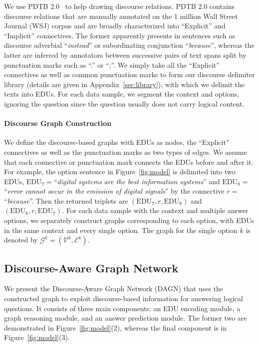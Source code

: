 \documentclass[11pt]{article}
\newcommand{\moe}[1]{{\color{black} #1}}
\begin{document}
\moe{We use PDTB 2.0~\cite{prasad2008penn} to help drawing discourse relations.}
PDTB 2.0 contains discourse relations that are manually annotated on the 1 million Wall Street Journal (WSJ) corpus and are broadly characterized into ``Explicit'' and ``Implicit'' connectives.
The former apparently presents in sentences such as discourse adverbial ``\textit{instead}'' or subordinating conjunction ``\textit{because}'',
whereas the latter are inferred by annotators between successive pairs of text spans split by punctuation marks such as ``.'' or ``;''.
We simply take all the ``Explicit'' connectives as well as common punctuation marks to form our discourse delimiter library (details are given in Appendix~\ref{sec:library}), with which we delimit the texts into EDUs.
For each data sample, we segment the context and options, ignoring the question since the question usually does not carry logical content.

\paragraph{Discourse Graph Construction} 
We define the discourse-based graphs with EDUs as nodes, the ``Explicit'' connectives as well as the punctuation marks as two types of edges.
We assume that each connective or punctuation mark connects the EDUs before and after it.
For example, the option sentence in Figure~\ref{fig:model}
is delimited into two EDUs, $\text{EDU}_7=$``\textit{digital systems are the best information systems}'' and $\text{EDU}_8=$``\textit{error cannot occur in the emission of digital signals}'' by the connective $r=$``\textit{because}''. Then the returned triplets are $(\text{EDU}_7, r, \text{EDU}_8)$ and $(\text{EDU}_8, r, \text{EDU}_7)$.
For each data sample with the context and multiple answer options, we separately construct graphs corresponding to each option, with EDUs in the same context and every single option. The graph for the single option $k$ is denoted by $\mathcal{G}^k = (\mathcal{V}^k, \mathcal{E}^k)$.

\subsection{Discourse-Aware Graph Network}
We present the Discourse-Aware Graph Network (DAGN) that uses the constructed graph to exploit discourse-based information for answering logical questions.
\moe{
It consists of three main components: an EDU encoding module, a graph reasoning module, and an answer prediction module.}
The former two are demonstrated in Figure~\ref{fig:model}(2), whereas the final component is in Figure~\ref{fig:model}(3).
\end{document}
